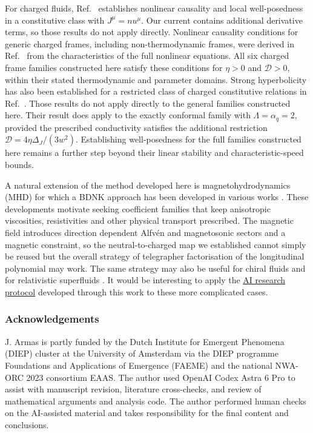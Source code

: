 For charged fluids, Ref.~\cite{BDN2022} establishes nonlinear causality
and local well-posedness in a constitutive class with $J^\mu=nu^\mu$.
Our current contains additional derivative terms, so those results do
not apply directly. Nonlinear causality conditions for generic charged frames, including
non-thermodynamic frames, were derived in
Ref.~\cite{AbboudSperanzaNoronha} from the characteristics of the full
nonlinear equations. All six charged frame families constructed here
satisfy these conditions for $\eta>0$ and $\mathcal D>0$, within their
stated thermodynamic and parameter domains. Strong hyperbolicity has also been established for a restricted class
of charged constitutive relations in Ref.~\cite{SchianchiAbalos}.
Those results do not apply directly to the general families constructed
here. Their result does apply to the exactly conformal family 
with $\Lambda=\alpha_q=2$, provided the prescribed conductivity
satisfies the additional restriction
$\mathcal D=4\eta\Delta_J/(3w^2)$. Establishing
well-posedness for the full families constructed here remains a further
step beyond their linear stability and characteristic-speed bounds.

A natural extension of the method developed here is magnetohydrodynamics (MHD) for which a BDNK approach has been developed in various works \cite{ArmasCamilloni, LierJainArmasPorth, HoultKovtunMHD, LierArmasPorth}. These developments motivate seeking coefficient families that keep
anisotropic viscosities, resistivities and other physical transport
prescribed. The magnetic field introduces direction dependent
Alfv\'en and magnetosonic sectors and a magnetic constraint, so the
neutral-to-charged map we established cannot simply be reused but the overall strategy of telegrapher factorisation of the longitudinal polynomial may work. The same strategy may also be useful for chiral fluids \cite{AbboudSperanzaNoronha} and for relativistic superfluids \cite{HoultShukla}. It would be interesting to apply the
\href{https://jacomearmas.org/research/BDNK}{AI research protocol} developed through this work
to these more complicated cases.

\subsubsection*{Acknowledgements}
J. Armas is partly funded by the Dutch Institute for Emergent Phenomena
(DIEP) cluster at the University of Amsterdam via the DIEP programme
Foundations and Applications of Emergence (FAEME) and the national
NWA-ORC 2023 consortium EAAS. The author used OpenAI Codex Astra 6 Pro
to assist with manuscript revision, literature cross-checks, and review
of mathematical arguments and analysis code. The author performed human
checks on the AI-assisted material and takes responsibility for the final
content and conclusions.

